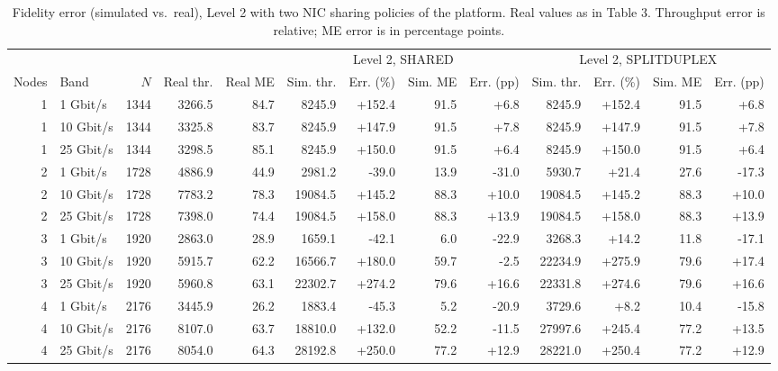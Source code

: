 \begin{table}[htbp]
\centering\small
\caption{Fidelity error (simulated vs.\ real), Level 2 with two NIC sharing policies of the platform. Real values as in Table 3. Throughput error is relative; ME error is in percentage points.}
\label{tab:fidelity-level2}
\begin{tabular}{rlrrr rrrr rrrr}
\toprule
 & & & & & \multicolumn{4}{c}{Level 2, SHARED} & \multicolumn{4}{c}{Level 2, SPLITDUPLEX} \\
\cmidrule(lr){6-9}\cmidrule(lr){10-13}
Nodes & Band & $N$ & Real thr. & Real ME & Sim. thr. & Err. (\%) & Sim. ME & Err. (pp) & Sim. thr. & Err. (\%) & Sim. ME & Err. (pp) \\
\midrule
1 & 1 Gbit/s & 1344 & 3266.5 & 84.7 & 8245.9 & +152.4 & 91.5 & +6.8 & 8245.9 & +152.4 & 91.5 & +6.8 \\
1 & 10 Gbit/s & 1344 & 3325.8 & 83.7 & 8245.9 & +147.9 & 91.5 & +7.8 & 8245.9 & +147.9 & 91.5 & +7.8 \\
1 & 25 Gbit/s & 1344 & 3298.5 & 85.1 & 8245.9 & +150.0 & 91.5 & +6.4 & 8245.9 & +150.0 & 91.5 & +6.4 \\
2 & 1 Gbit/s & 1728 & 4886.9 & 44.9 & 2981.2 & -39.0 & 13.9 & -31.0 & 5930.7 & +21.4 & 27.6 & -17.3 \\
2 & 10 Gbit/s & 1728 & 7783.2 & 78.3 & 19084.5 & +145.2 & 88.3 & +10.0 & 19084.5 & +145.2 & 88.3 & +10.0 \\
2 & 25 Gbit/s & 1728 & 7398.0 & 74.4 & 19084.5 & +158.0 & 88.3 & +13.9 & 19084.5 & +158.0 & 88.3 & +13.9 \\
3 & 1 Gbit/s & 1920 & 2863.0 & 28.9 & 1659.1 & -42.1 & 6.0 & -22.9 & 3268.3 & +14.2 & 11.8 & -17.1 \\
3 & 10 Gbit/s & 1920 & 5915.7 & 62.2 & 16566.7 & +180.0 & 59.7 & -2.5 & 22234.9 & +275.9 & 79.6 & +17.4 \\
3 & 25 Gbit/s & 1920 & 5960.8 & 63.1 & 22302.7 & +274.2 & 79.6 & +16.6 & 22331.8 & +274.6 & 79.6 & +16.6 \\
4 & 1 Gbit/s & 2176 & 3445.9 & 26.2 & 1883.4 & -45.3 & 5.2 & -20.9 & 3729.6 & +8.2 & 10.4 & -15.8 \\
4 & 10 Gbit/s & 2176 & 8107.0 & 63.7 & 18810.0 & +132.0 & 52.2 & -11.5 & 27997.6 & +245.4 & 77.2 & +13.5 \\
4 & 25 Gbit/s & 2176 & 8054.0 & 64.3 & 28192.8 & +250.0 & 77.2 & +12.9 & 28221.0 & +250.4 & 77.2 & +12.9 \\
\bottomrule
\end{tabular}
\end{table}
